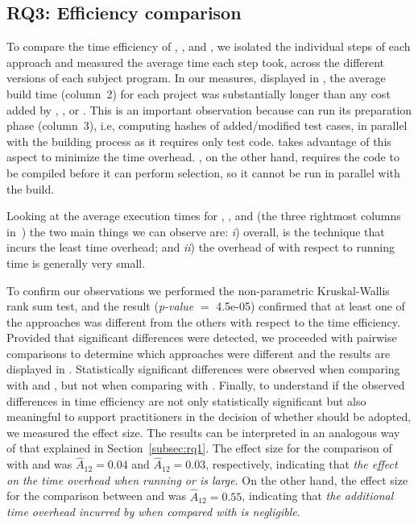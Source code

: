 \subsection{RQ3: Efficiency comparison}
\label{subsec:rq3}
To compare the time efficiency of \ek, \fs, and \fz, 
we isolated the individual steps of each approach and measured the average time each step took, across the different versions of each subject program. 
In our measures, displayed in , 
the average build time (column~2) for each project was substantially longer than any cost added by \ek, \fs, or \fz.
This is an important observation because \fs can run its preparation phase (column~3), i.e, computing hashes of added/modified test cases, in parallel with the building process as it requires only test code.
\fz takes advantage of this aspect to minimize the time overhead. %
\ek, on the other hand, requires the code to be compiled before it can perform selection, so it cannot be run in parallel with the build.

%
%
%

Looking at the average execution times for \fs, \ek, and \fz 
(the three rightmost columns in~) 
the two main things we can observe are: 
\textit{i}) overall, \fs is the technique that incurs the least time overhead;
and \textit{ii}) the overhead of \fz with respect to \ek running time is generally very small.

To confirm our observations we performed the non-parametric Kruskal-Wallis rank sum test, 
and the result (\textit{p-value} $=$ 4.5e-05) confirmed that at least one of the approaches was different from the others with respect to the time efficiency.
Provided that significant differences were detected, we proceeded with pairwise comparisons to determine which approaches were different
and the results are displayed in .
Statistically significant differences were observed when comparing \fs with \ek and \fz, but not when comparing \fz with \ek.
Finally, to understand if the observed differences in time efficiency are not only statistically significant but also meaningful to support practitioners in the decision of whether \fz should be adopted, we measured the effect size.
The results can be interpreted in an analogous way of that explained in Section~\ref{subsec:rq1}.
The effect size for the comparison of \fs with \ek and \fz was $\hat{A}_{12}=0.04$ and $\hat{A}_{12}=0.03$, respectively, indicating that \emph{the effect on the time overhead when running \ek or \fz is large}.
On the other hand, the effect size for the comparison between \fz and \ek was $\hat{A}_{12}=0.55$, indicating that \emph{the additional time overhead incurred by \fz when compared with \ek is negligible}.

